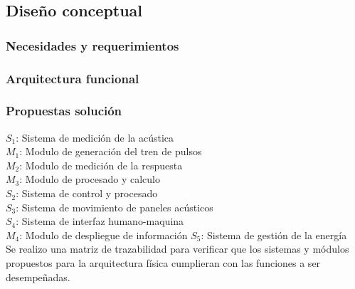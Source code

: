 \documentclass[letterpaper,12pt,oneside]{article}
\begin{document}
\subsection{Diseño conceptual}
\subsubsection{Necesidades y requerimientos}
\subsubsection{Arquitectura funcional}
\subsubsection{Propuestas solución}

$S_{1}$: Sistema de medición de la acústica \\
\tab    $M_{1}$: Modulo de generación del tren de pulsos \\
\tab    $M_{2}$: Modulo de medición de la respuesta \\
\tab    $M_{3}$: Modulo de procesado y calculo \\
$S_{2}$: Sistema de control y procesado \\
$S_{3}$: Sistema de movimiento de paneles acústicos \\
$S_{4}$: Sistema de interfaz humano-maquina \\
\tab    $M_{4}$: Modulo de despliegue de información
$S_{5}$: Sistema de gestión de la energía \\

Se realizo una matriz de trazabilidad para verificar que los sistemas y módulos propuestos para la arquitectura física cumplieran con las funciones a ser desempeñadas.

\end{document}
